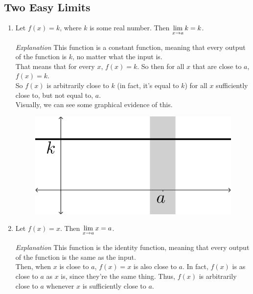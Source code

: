 \subsection*{Two Easy Limits}
\begin{enumerate}
  \item Let $f(x) = k$, where $k$ is some real number.
  Then $\displaystyle \lim_{x\to a} k = k$.

  \begin{describe}{\textit{Explanation}}
    This function is a constant function, meaning that every output of the function is $k$, no matter what the input is.\\

    That means that for every $x$, $f(x) = k$. So then for all $x$ that are close to $a$, $f(x) = k$.\\

    So $f(x)$ is arbitrarily close to $k$ (in fact, it's equal to $k$) for all $x$ sufficiently close to, but not equal to, $a$.\\

    Visually, we can see some graphical evidence of this.
    \begin{figure}[h!tb]
      \includegraphics[scale=0.5]{./1_limits/images/1-2_graph1.png}
      \centering
    \end{figure}
  \end{describe}
  \item Let $f(x) = x$. Then $\displaystyle \lim_{x\to a} x = a$.

  \begin{describe}{\textit{Explanation}}
    This function is the identity function, meaning that every output of the function is the same as the input.\\

    Then, when $x$ is close to $a$, $f(x) = x$ is also close to $a$.
    In fact, $f(x)$ is as close to $a$ as $x$ is, since they're the same thing.
    Thus, $f(x)$ is arbitrarily close to $a$ whenever $x$ is sufficiently close to $a$.\\


\end{describe}
\end{enumerate}
